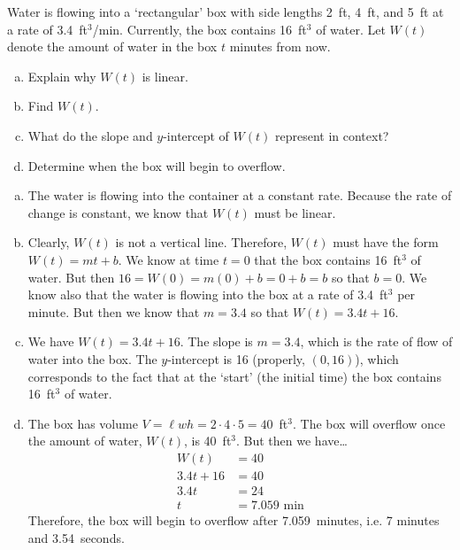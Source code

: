 \documentclass[11pt,letterpaper]{article}
\begin{document}
\newpage



 Water is flowing into a `rectangular' box with side lengths 2~ft, 4~ft, and 5~ft at a rate of 3.4~ft$^3$/min. Currently, the box contains 16~ft$^3$ of water. Let $W(t)$ denote the amount of water in the box $t$ minutes from now.
	\begin{enumerate}[(a)]
	\item Explain why $W(t)$ is linear.
	\item Find $W(t)$. 
	\item What do the slope and $y$-intercept of $W(t)$ represent in context?
	\item Determine when the box will begin to overflow. 
	\end{enumerate} \pspace

\sol
\begin{enumerate}[(a)]
\item The water is flowing into the container at a constant rate. Because the rate of change is constant, we know that $W(t)$ must be linear. \pspace

\item Clearly, $W(t)$ is not a vertical line. Therefore, $W(t)$ must have the form $W(t)= mt + b$. We know at time $t= 0$ that the box contains 16~ft$^3$ of water. But then $16= W(0)= m(0) + b= 0 + b= b$ so that $b= 0$. We know also that the water is flowing into the box at a rate of 3.4~ft$^3$ per minute. But then we know that $m= 3.4$ so that $W(t)= 3.4t + 16$. \pspace

\item We have $W(t)= 3.4t + 16$. The slope is $m= 3.4$, which is the rate of flow of water into the box. The $y$-intercept is 16 (properly, $(0, 16)$), which corresponds to the fact that at the `start' (the initial time) the box contains 16~ft$^3$ of water. \pspace

\item The box has volume $V= \ell w h= 2 \cdot 4 \cdot 5= 40$~ft$^3$. The box will overflow once the amount of water, $W(t)$, is 40~ft$^3$. But then we have\dots
	\[
	\begin{aligned}
	W(t)&= 40 \\
	3.4t + 16&= 40 \\
	3.4t&= 24 \\
	t&= 7.059 \text{ min}
	\end{aligned}
	\]
Therefore, the box will begin to overflow after 7.059~minutes, i.e. 7 minutes and 3.54~seconds.
\end{enumerate}
\end{document}
